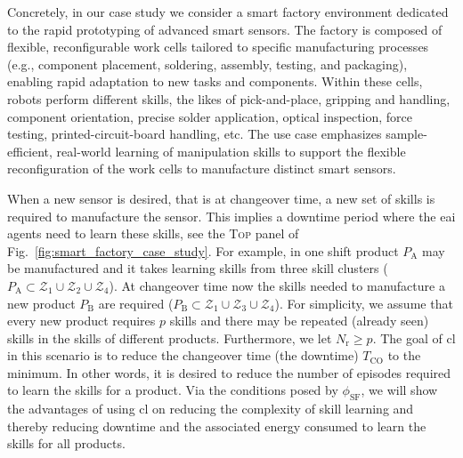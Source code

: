 \documentclass[12pt]{article}
\begin{document}
Concretely, in our case study we consider a smart factory environment dedicated to the rapid prototyping of advanced smart sensors. The factory is composed of flexible, reconfigurable work cells tailored to specific manufacturing processes (e.g., component placement, soldering, assembly, testing, and packaging), enabling rapid adaptation to new tasks and components. Within these cells, robots perform different skills, the likes of pick-and-place, gripping and handling, component orientation, precise solder application, optical inspection, force testing, printed-circuit-board handling, etc. The use case emphasizes sample-efficient, real-world learning of manipulation skills to support the flexible reconfiguration of the work cells to manufacture distinct smart sensors.

When a new sensor is desired, that is at changeover time, a new set of skills is required to manufacture the sensor. This implies a downtime period where the \ac{eai} agents need to learn these skills, see the \textsc{Top} panel of Fig.~\ref{fig:smart_factory_case_study}. For example, in one shift product $ P_\mathrm{A} $ may be manufactured and it takes learning skills from three skill clusters ($ P_\text{A}\subset\mathcal{Z}_1
\cup\mathcal{Z}_2\cup\mathcal{Z}_4 $). At changeover time now the skills needed to manufacture a new product $ P_\mathrm{B} $ are required ($P_\text{B}\subset\mathcal{Z}_1\cup\mathcal{Z}_3\cup\mathcal{Z}_4 $). For simplicity, we assume that every new product requires $ p $ skills and there may be repeated (already seen) skills in the skills of different products. Furthermore, we let $ N_\mathrm{r} \geq p $. The goal of \ac{cl} in this scenario is to reduce the changeover time (the downtime) $ T_\mathrm{CO} $ to the minimum. In other words, it is desired to reduce the number of episodes required to learn the skills for a product. Via the conditions posed by $ \phi_\text{SF}$, we will show the advantages of using \ac{cl} on reducing the complexity of skill learning and thereby reducing downtime and the associated energy consumed to learn the skills for all products.
\end{document}
